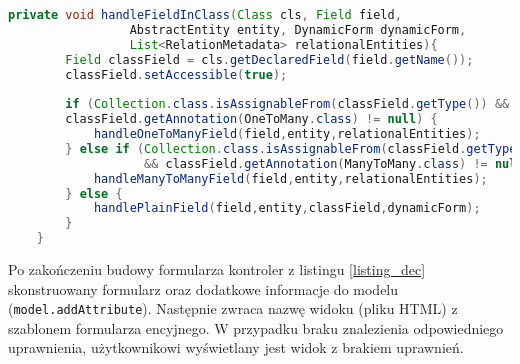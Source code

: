 \begin{small}
	\begin{lstlisting}[language=Java, frame=lines, numberstyle=\tiny, stepnumber=5, caption=Konstrukcja formularza: \texttt{ClassFieldHandler.java}\label{listing_handler}., firstnumber=1]
	private void handleFieldInClass(Class cls, Field field, 
	             AbstractEntity entity, DynamicForm dynamicForm, 
	             List<RelationMetadata> relationalEntities){
	    Field classField = cls.getDeclaredField(field.getName());
	    classField.setAccessible(true);
	
	    if (Collection.class.isAssignableFrom(classField.getType()) && 
	    classField.getAnnotation(OneToMany.class) != null) {
	        handleOneToManyField(field,entity,relationalEntities);
	    } else if (Collection.class.isAssignableFrom(classField.getType()) 
	               && classField.getAnnotation(ManyToMany.class) != null) {
	        handleManyToManyField(field,entity,relationalEntities);
	    } else {
	        handlePlainField(field,entity,classField,dynamicForm);
	    }
	}
	\end{lstlisting} 
\end{small}

Po zakończeniu budowy formularza kontroler z listingu \ref{listing_dec} skonstruowany formularz oraz dodatkowe informacje do modelu (\texttt{model.addAttribute}). Następnie zwraca nazwę widoku (pliku HTML) z szablonem formularza encyjnego. W przypadku braku znalezienia odpowiedniego uprawnienia, użytkownikowi wyświetlany jest widok z brakiem uprawnień. 